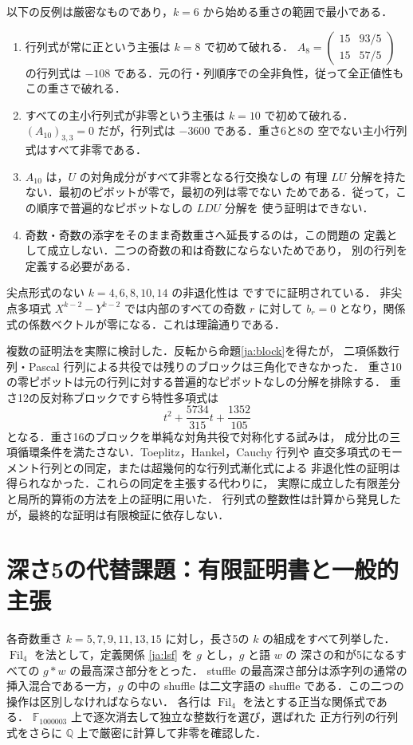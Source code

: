 \documentclass[12pt]{amsart}
\theoremstyle{definition}
\theoremstyle{remark}
\numberwithin{equation}{section}
\newcommand{\Q}{\mathbb{Q}}
\newcommand{\Fil}{\operatorname{Fil}}
\theoremstyle{definition}
\theoremstyle{remark}
\begin{document}
以下の反例は厳密なものであり，$k=6$ から始める重さの範囲で最小である．
\begin{enumerate}
\item 行列式が常に正という主張は $k=8$ で初めて破れる．
$A_8=\left(\begin{smallmatrix}15&93/5\\15&57/5\end{smallmatrix}\right)$
の行列式は $-108$ である．元の行・列順序での全非負性，従って全正値性も
この重さで破れる．
\item すべての主小行列式が非零という主張は $k=10$ で初めて破れる．
$(A_{10})_{3,3}=0$ だが，行列式は $-3600$ である．重さ6と8の
空でない主小行列式はすべて非零である．
\item $A_{10}$ は，$U$ の対角成分がすべて非零となる行交換なしの
有理 $LU$ 分解を持たない．最初のピボットが零で，最初の列は零でない
ためである．従って，この順序で普遍的なピボットなしの $LDU$ 分解を
使う証明はできない．
\item 奇数・奇数の添字をそのまま奇数重さへ延長するのは，この問題の
定義として成立しない．二つの奇数の和は奇数にならないためであり，
別の行列を定義する必要がある．
\end{enumerate}
尖点形式のない $k=4,6,8,10,14$ の非退化性は
\cite[Proposition 5.15]{jBR} ですでに証明されている．
非尖点多項式 $X^{k-2}-Y^{k-2}$ では内部のすべての奇数 $r$ に対して
$b_r=0$ となり，関係式の係数ベクトルが零になる．これは理論通りである．

複数の証明法を実際に検討した．反転から命題\ref{ja:block}を得たが，
二項係数行列・Pascal 行列による共役では残りのブロックは三角化できなかった．
重さ10の零ピボットは元の行列に対する普遍的なピボットなしの分解を排除する．
重さ12の反対称ブロックですら特性多項式は
\[
 t^2+\frac{5734}{315}t+\frac{1352}{105}
\]
となる．重さ16のブロックを単純な対角共役で対称化する試みは，
成分比の三項循環条件を満たさない．Toeplitz，Hankel，Cauchy 行列や
直交多項式のモーメント行列との同定，または超幾何的な行列式漸化式による
非退化性の証明は得られなかった．これらの同定を主張する代わりに，
実際に成立した有限差分と局所的算術の方法を上の証明に用いた．
行列式の整数性は計算から発見したが，最終的な証明は有限検証に依存しない．

\section{深さ5の代替課題：有限証明書と一般的主張}
各奇数重さ $k=5,7,9,11,13,15$ に対し，長さ5の $k$ の組成をすべて列挙した．
$\Fil_4$ を法として，定義関係 \eqref{ja:lsf} を $g$ とし，$g$ と語 $w$ の
深さの和が5になるすべての $g*w$ の最高深さ部分をとった．
stuffle の最高深さ部分は添字列の通常の挿入混合である一方，$g$ の中の
shuffle は二文字語の shuffle である．この二つの操作は区別しなければならない．
各行は $\Fil_4$ を法とする正当な関係式である．
$\mathbb F_{1000003}$ 上で逐次消去して独立な整数行を選び，選ばれた
正方行列の行列式をさらに $\Q$ 上で厳密に計算して非零を確認した．
\end{document}
